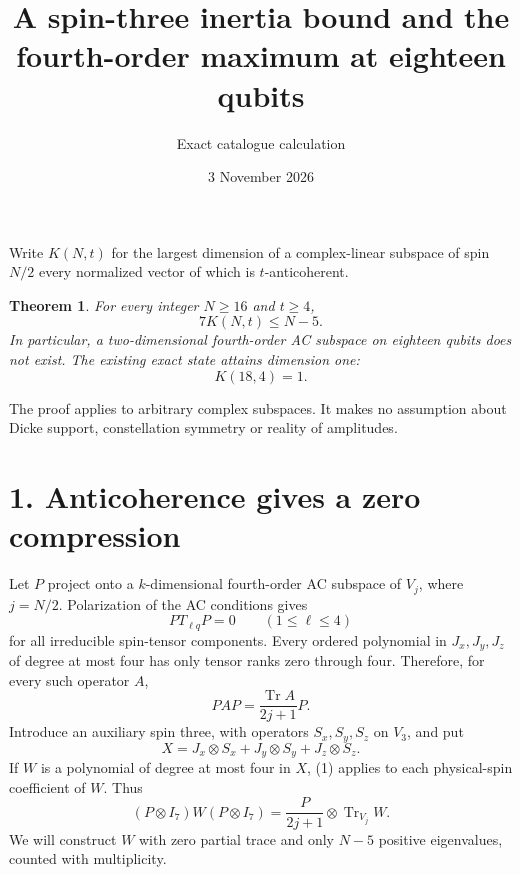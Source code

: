 \documentclass[11pt]{article}
\newtheorem{theorem}{Theorem}
\newcommand{\Tr}{\operatorname{Tr}}
\begin{document}
\title{A spin-three inertia bound and the fourth-order maximum at eighteen qubits}
\author{Exact catalogue calculation}
\date{3 November 2026}
\maketitle
Write $K(N,t)$ for the largest dimension of a complex-linear subspace of spin $N/2$
every normalized vector of which is $t$-anticoherent.
\begin{theorem}
For every integer $N\ge16$ and $t\ge4$,
\[
 \boxed{7K(N,t)\le N-5.}
\]
In particular, a two-dimensional fourth-order AC subspace on eighteen
qubits does not exist. The existing exact state attains dimension one:
\[
 \boxed{K(18,4)=1.}
\]
\end{theorem}
The proof applies to arbitrary complex subspaces. It makes no assumption
about Dicke support, constellation symmetry or reality of amplitudes.

\section*{1. Anticoherence gives a zero compression}
Let $P$ project onto a $k$-dimensional fourth-order AC subspace of $V_j$,
where $j=N/2$. Polarization of the AC conditions gives
\[
 PT_{\ell q}P=0\qquad(1\le\ell\le4)
\]
for all irreducible spin-tensor components. Every ordered polynomial in
$J_x,J_y,J_z$ of degree at most four has only tensor ranks zero through
four. Therefore, for every such operator $A$,
\[
 PAP=\frac{\Tr A}{2j+1}P. \tag{1}
\]
Introduce an auxiliary spin three, with operators $S_x,S_y,S_z$ on $V_3$,
and put
\[
 X=J_x\otimes S_x+J_y\otimes S_y+J_z\otimes S_z.
\]
If $W$ is a polynomial of degree at most four in $X$, (1) applies to each
physical-spin coefficient of $W$. Thus
\[
 (P\otimes I_7)W(P\otimes I_7)
 =\frac{P}{2j+1}\otimes\Tr_{V_j}W. \tag{2}
\]
We will construct $W$ with zero partial trace and only $N-5$ positive
eigenvalues, counted with multiplicity.
\end{document}
